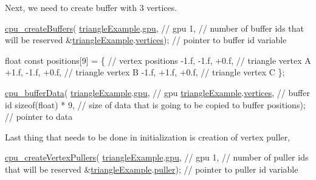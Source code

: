 Next, we need to create buffer with 3 vertices. 
\begin{DoxyCodeInclude}
  \hyperlink{buffer_8h_a6ba9c58dc4b7bc81e83d3dae3c6b292f}{cpu\_createBuffers}(
      \hyperlink{triangleExample_8c_a235d77635ad30ec86f81d2caabbdc1b5}{triangleExample}.\hyperlink{structTriangleExampleVariables_a6c5c3f82065ae9aac07f9e6f11dd03b3}{gpu},         \textcolor{comment}{// gpu}
      1,                           \textcolor{comment}{// number of buffer ids that will be reserved}
      &\hyperlink{triangleExample_8c_a235d77635ad30ec86f81d2caabbdc1b5}{triangleExample}.\hyperlink{structTriangleExampleVariables_acb7968b625f2e01866994769209cf32e}{vertices});  \textcolor{comment}{// pointer to buffer id variable}

  \textcolor{keywordtype}{float} \textcolor{keyword}{const} positions[9] = \{
      \textcolor{comment}{// vertex positions}
      -1.f, -1.f, +0.f,  \textcolor{comment}{// triangle vertex A}
      +1.f, -1.f, +0.f,  \textcolor{comment}{// triangle vertex B}
      -1.f, +1.f, +0.f,  \textcolor{comment}{// triangle vertex C}
  \};

  \hyperlink{buffer_8h_aad292278b58c11db74df3cb3e3a52f22}{cpu\_bufferData}(
      \hyperlink{triangleExample_8c_a235d77635ad30ec86f81d2caabbdc1b5}{triangleExample}.\hyperlink{structTriangleExampleVariables_a6c5c3f82065ae9aac07f9e6f11dd03b3}{gpu},       \textcolor{comment}{// gpu}
      \hyperlink{triangleExample_8c_a235d77635ad30ec86f81d2caabbdc1b5}{triangleExample}.\hyperlink{structTriangleExampleVariables_acb7968b625f2e01866994769209cf32e}{vertices},  \textcolor{comment}{// buffer id}
      \textcolor{keyword}{sizeof}(\textcolor{keywordtype}{float}) * 9,  \textcolor{comment}{// size of data that is going to be copied to buffer}
      positions);         \textcolor{comment}{// pointer to data}
\end{DoxyCodeInclude}
Last thing that needs to be done in initialization is creation of vertex puller, 
\begin{DoxyCodeInclude}
  \hyperlink{vertexPuller_8h_a3b9678475f48f09c3ddbd4316fce3e08}{cpu\_createVertexPullers}(
      \hyperlink{triangleExample_8c_a235d77635ad30ec86f81d2caabbdc1b5}{triangleExample}.\hyperlink{structTriangleExampleVariables_a6c5c3f82065ae9aac07f9e6f11dd03b3}{gpu},       \textcolor{comment}{// gpu}
      1,                         \textcolor{comment}{// number of puller ids that will be reserved}
      &\hyperlink{triangleExample_8c_a235d77635ad30ec86f81d2caabbdc1b5}{triangleExample}.\hyperlink{structTriangleExampleVariables_a82e39dd0d18fc57422686229d801e39f}{puller});  \textcolor{comment}{// pointer to puller id variable}
\end{DoxyCodeInclude}
